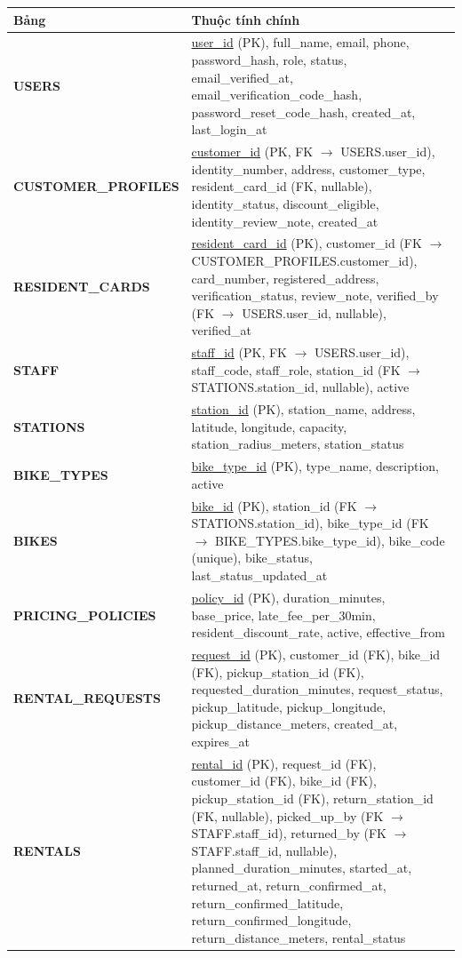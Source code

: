 \small
\begin{longtable}{P{0.30\textwidth}P{0.60\textwidth}}
\toprule
\textbf{Bảng} & \textbf{Thuộc tính chính} \\
\midrule
\textbf{USERS} & \underline{user\_id} (PK), full\_name, email, phone, password\_hash, role, status, email\_verified\_at, email\_verification\_code\_hash, password\_reset\_code\_hash, created\_at, last\_login\_at \\
\textbf{CUSTOMER\_PROFILES} & \underline{customer\_id} (PK, FK $\rightarrow$ USERS.user\_id), identity\_number, address, customer\_type, resident\_card\_id (FK, nullable), identity\_status, discount\_eligible, identity\_review\_note, created\_at \\
\textbf{RESIDENT\_CARDS} & \underline{resident\_card\_id} (PK), customer\_id (FK $\rightarrow$ CUSTOMER\_PROFILES.customer\_id), card\_number, registered\_address, verification\_status, review\_note, verified\_by (FK $\rightarrow$ USERS.user\_id, nullable), verified\_at \\
\textbf{STAFF} & \underline{staff\_id} (PK, FK $\rightarrow$ USERS.user\_id), staff\_code, staff\_role, station\_id (FK $\rightarrow$ STATIONS.station\_id, nullable), active \\
\textbf{STATIONS} & \underline{station\_id} (PK), station\_name, address, latitude, longitude, capacity, station\_radius\_meters, station\_status \\
\textbf{BIKE\_TYPES} & \underline{bike\_type\_id} (PK), type\_name, description, active \\
\textbf{BIKES} & \underline{bike\_id} (PK), station\_id (FK $\rightarrow$ STATIONS.station\_id), bike\_type\_id (FK $\rightarrow$ BIKE\_TYPES.bike\_type\_id), bike\_code (unique), bike\_status, last\_status\_updated\_at \\
\textbf{PRICING\_POLICIES} & \underline{policy\_id} (PK), duration\_minutes, base\_price, late\_fee\_per\_30min, resident\_discount\_rate, active, effective\_from \\
\textbf{RENTAL\_REQUESTS} & \underline{request\_id} (PK), customer\_id (FK), bike\_id (FK), pickup\_station\_id (FK), requested\_duration\_minutes, request\_status, pickup\_latitude, pickup\_longitude, pickup\_distance\_meters, created\_at, expires\_at \\
\textbf{RENTALS} & \underline{rental\_id} (PK), request\_id (FK), customer\_id (FK), bike\_id (FK), pickup\_station\_id (FK), return\_station\_id (FK, nullable), picked\_up\_by (FK $\rightarrow$ STAFF.staff\_id), returned\_by (FK $\rightarrow$ STAFF.staff\_id, nullable), planned\_duration\_minutes, started\_at, returned\_at, return\_confirmed\_at, return\_confirmed\_latitude, return\_confirmed\_longitude, return\_distance\_meters, rental\_status \\

\end{longtable}
